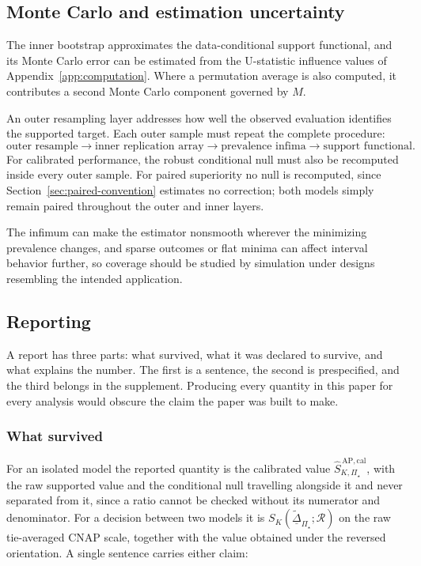 \documentclass[11pt]{article}
\newcommand{\Regime}{\mathcal{R}}
\newcommand{\PSet}{\Pi_\star}
\newcommand{\SRobCalHat}{\widehat S_{K,\PSet}^{\,\mathrm{AP,cal}}}
\newcommand{\RobDta}{\underline{\widetilde{\Delta}}_{\PSet}}
\theoremstyle{remark}
\begin{document}
\subsection{Monte Carlo and estimation uncertainty}

The inner bootstrap approximates the data-conditional support functional, and its Monte Carlo error can be estimated from the U-statistic influence values of Appendix~\ref{app:computation}. Where a permutation average is also computed, it contributes a second Monte Carlo component governed by $M$.

An outer resampling layer addresses how well the observed evaluation identifies the supported target. Each outer sample must repeat the complete procedure:
\[
\text{outer resample}
\longrightarrow
\text{inner replication array}
\longrightarrow
\text{prevalence infima}
\longrightarrow
\text{support functional}.
\]
For calibrated performance, the robust conditional null must also be recomputed inside every outer sample. For paired superiority no null is recomputed, since Section~\ref{sec:paired-convention} estimates no correction; both models simply remain paired throughout the outer and inner layers.

The infimum can make the estimator nonsmooth wherever the minimizing prevalence changes, and sparse outcomes or flat minima can affect interval behavior further, so coverage should be studied by simulation under designs resembling the intended application.

\subsection{Reporting}

A report has three parts: what survived, what it was declared to survive, and what explains the number. The first is a sentence, the second is prespecified, and the third belongs in the supplement. Producing every quantity in this paper for every analysis would obscure the claim the paper was built to make.

\subsubsection*{What survived}

For an isolated model the reported quantity is the calibrated value $\SRobCalHat$, with the raw supported value and the conditional null travelling alongside it and never separated from it, since a ratio cannot be checked without its numerator and denominator. For a decision between two models it is $S_K(\RobDta;\Regime)$ on the raw tie-averaged CNAP scale, together with the value obtained under the reversed orientation. A single sentence carries either claim:
\end{document}
